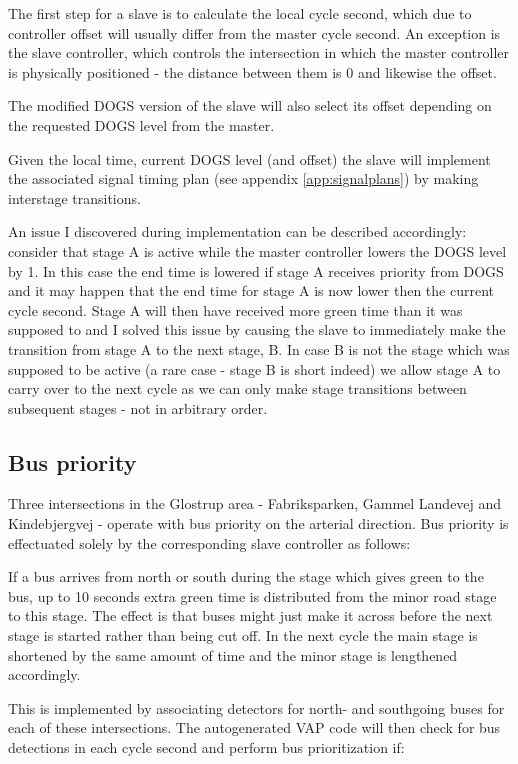 The first step for a slave is to calculate the local cycle second, which due to controller offset will usually differ from the master cycle second. An exception is the slave controller, which controls the intersection in which the master controller is physically positioned - the distance between them is 0 and likewise the offset.

The modified DOGS version of the slave will also select its offset depending on the requested DOGS level from the master.

Given the local time, current DOGS level (and offset) the slave will implement the associated signal timing plan (see appendix \ref{app:signalplans}) by making interstage transitions.

An issue I discovered during implementation can be described accordingly:
consider that stage A is active while the master controller lowers the DOGS level by 1. In this case the end time is lowered if stage A receives priority from DOGS and it may happen that the end time for stage A is now lower then the current cycle second. Stage A will then have received more green time than it was supposed to and I solved this issue by causing the slave to immediately make the transition from stage A to the next stage, B. In case B is not the stage which was supposed to be active (a rare case - stage B is short indeed) we allow stage A to carry over to the next cycle as we can only make stage transitions between subsequent stages - not in arbitrary order.

\subsection{Bus priority}
Three intersections in the Glostrup area - Fabriksparken, Gammel Landevej and Kindebjergvej - operate with bus priority on the arterial direction. Bus priority is effectuated solely by the corresponding slave controller as follows:

If a bus arrives from north or south during the stage which gives green to the bus, up to 10 seconds extra green time is distributed from the minor road stage to this stage. The effect is that buses might just make it across before the next stage is started rather than being cut off. In the next cycle the main stage is shortened by the same amount of time and the minor stage is lengthened accordingly.

This is implemented by associating detectors for north- and southgoing buses for each of these intersections. The autogenerated VAP code will then check for bus detections in each cycle second and perform bus prioritization if:

